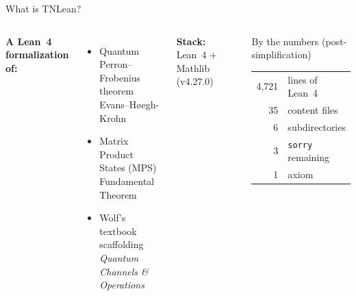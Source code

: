 \documentclass[aspectratio=169,10pt]{beamer}
\begin{document}
\begin{frame}{What is TNLean?}
    \begin{columns}[T]
        \textbf{A Lean~4 formalization of:}
        \begin{itemize}\itemsep0.3em
            \item \textcolor{leangreen}{Quantum Perron--Frobenius theorem}\\
                  {\small Evans--H\o egh-Krohn \cite{Evans1978Spectral}}
            \item \textcolor{leangreen}{Matrix Product States (MPS)}\\
                  {\small Fundamental Theorem \cite{Perez-Garcia2007Matrix}}
            \item \textcolor{leanblue}{Wolf's textbook scaffolding}\\
                  {\small \emph{Quantum Channels \& Operations} \cite{Wolf2012Quantum}}
        \end{itemize}

        \vspace{0.5em}
        \textbf{Stack:} Lean~4 + Mathlib (v4.27.0)

        \begin{block}{\small By the numbers (post-simplification)}
            \begin{tabular}{rl}
                \textcolor{leangreen}{4{,}721} & lines of Lean~4 \\
                \textcolor{leangreen}{35}      & content files \\
                \textcolor{leangreen}{6}       & subdirectories \\
                \textcolor{amber}{3}           & \texttt{sorry} remaining \\
                \textcolor{softred}{1}         & axiom \\
            \end{tabular}
        \end{block}
    \end{columns}
\end{frame}
\end{document}

